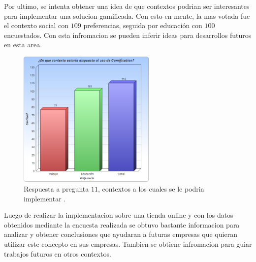 Por ultimo, se intenta obtener una idea de que contextos podrian ser interesantes para implementar una
solucion gamificada. Con esto en mente, la mas votada fue el contexto social con $109$ preferencias, 
seguida por educación con $100$ encuestados. Con esta infromacion se pueden inferir ideas para 
desarrollos futuros en esta area.

\begin{figure}[!htb]
  \centering
  \includegraphics[width=0.6\textwidth]{images/Graficos/graf_5_12.png}
  \caption[chart5.12]{Respuesta a pregunta $11$, contextos a los cuales se le podria implementar {\GAM}.}
  \label{fig:chart5.12}
\end{figure}


Luego de realizar la implementacion {\GAM} sobre una tienda online y con los datos obtenidos mediante
la encuesta realizada se obtuvo bastante informacion para analizar y obtener conclusiones que ayudaran 
a futuras empresas que quieran utilizar este concepto en sus empresas. Tambien se obtiene infromacion
para guiar trabajos futuros en otros contextos.
